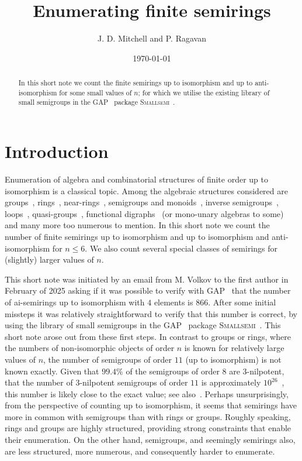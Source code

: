 \documentclass{article}
\title{Enumerating finite semirings}
\author{J. D. Mitchell and P. Ragavan}
\date{\today}
\theoremstyle{definition}
\theoremstyle{plain}
\newcommand{\GAP}{\textsc{GAP}~\cite{GAP4}\xspace}
\newcommand{\Smallsemi}{\textsc{Smallsemi}~\cite{Smallsemi}\xspace}
\begin{document}
\maketitle

\begin{abstract}
  In this short note we count the finite semirings up to isomorphism
  and up to anti-isomorphism for some small values of $n$; for which we
  utilise the existing library of small semigroups in the \GAP
  package \Smallsemi.
\end{abstract}

\section{Introduction}



Enumeration of algebra and combinatorial structures of finite order up to
isomorphism is a classical topic. Among the algebraic structures considered are
groups~\cite{BESCHE2002,}, rings~\cite{Blackburn2022, Fine1993, Kruse1970,
A027623}, near-rings~\cite{SONATA, A305858},
semigroups and monoids~\cite{}, inverse semigroups~\cite{}, loops~\cite{},
quasi-groups~\cite{}, functional digraphs~\cite{} (or mono-unary algebras to
some) and many more too numerous to mention. In this short note we count the
number of finite semirings up to isomorphism and up to isomorphism and
anti-isomorphism for $n \leq 6$. We also count several special classes of
semirings for (slightly) larger values of $n$.

This short note was initiated by an email from M. Volkov to the first author in
February of 2025 asking if it was possible to verify with \GAP that the number
of ai-semirings up to isomorphism with $4$ elements is $866$.
After some initial missteps it was relatively straightforward to verify that
this number is correct, by using the library of small semigroups in the \GAP
package \Smallsemi. This short note arose out from these first steps. In
contrast to groups or rings, where the numbers of non-isomorphic objects of
order $n$ is known for relatively large values of $n$, the number of semigroups
of order $11$ (up to isomorphism) is not known exactly. Given that $99.4\%$ of
the semigroups of order $8$ are $3$-nilpotent, that the number of $3$-nilpotent
semigroups of order $11$ is approximately $10 ^ {26}$~\cite{}, this number is
likely close to the exact value; see also~\cite{}. Perhaps unsurprisingly, from
the perspective of counting up to isomorphism, it seems that semirings have
more in common with semigroups than with rings or groups. Roughly speaking,
rings and groups are highly structured, providing strong constraints that
enable their enumeration. On the other hand, semigroups, and seemingly
semirings also, are less structured, more numerous, and consequently harder to
enumerate.
\end{document}
